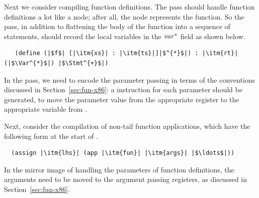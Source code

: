 \documentclass[11pt]{book}
\begin{document}
Next we consider compiling function definitions.  The 
pass should handle function definitions a lot like a 
node; after all, the  node represents the 
function. So the  pass, in addition to flattening the
body of the function into a sequence of statements, should record the
local variables in the $\mathit{var}^{*}$ field as shown below.
\begin{lstlisting}
   (define (|$f$| [|\itm{xs}| : |\itm{ts}|]|$^{*}$|) : |\itm{rt}| (|$\Var^{*}$|) |$\Stmt^{+}$|)
\end{lstlisting}
In the  pass, we need to encode the
parameter passing in terms of the conventions discussed in
Section~\ref{sec:fun-x86}: a  instruction for each
parameter should be generated, to move the parameter value from the
appropriate register to the appropriate variable from .

Next, consider the compilation of non-tail function applications, which have
the following form at the start of .
\begin{lstlisting}
  (assign |\itm{lhs}| (app |\itm{fun}| |\itm{args}| |$\ldots$|))
\end{lstlisting}
In the mirror image of handling the parameters of function
definitions, the arguments  need to be moved to the
argument passing registers, as discussed in
Section~\ref{sec:fun-x86}.
\end{document}
